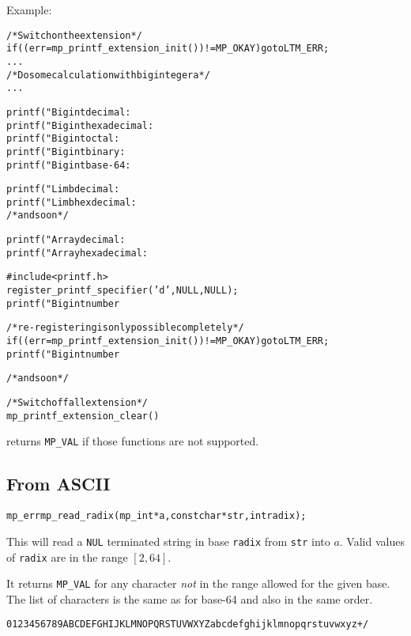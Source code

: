\documentclass[synpaper]{book}
\begin{document}
Example:
\begin{alltt}

/* Switch on the extension */
if((err = mp_printf_extension_init()) != MP_OKAY)   goto LTM_ERR;
   ...
/* Do some calculation with big integer a */
   ...

printf("Bigint decimal: %Zd \textbackslash{}n", &a);
printf("Bigint hexadecimal: %Zx \textbackslash{}n", &a);
printf("Bigint octal: %Zo \textbackslash{}n", &a);
printf("Bigint binary: %Zb \textbackslash{}n", &a);
printf("Bigint base-64: %Z@ \textbackslash{}n", &a);

printf("Limb decimal: %Md \textbackslash{}n", a.dp[0]);
printf("Limb hexdecimal: %Mx \textbackslash{}n", a.dp[0]);
/* and so on */

printf("Array decimal: %Nd \textbackslash{}n", &a);
printf("Array hexadecimal: %Nx \textbackslash{}n", &a);

#include <printf.h>
register_printf_specifier('d', NULL, NULL);
printf("Bigint number %d: %Zx \textbackslash{}n", 123, &a);

/* re-registering is only possible completely */
if((err = mp_printf_extension_init()) != MP_OKAY)   goto LTM_ERR;
printf("Bigint number %i: %Zd \textbackslash{}n", 123, &a);

/* and so on */

/* Switch off all extension */
mp_printf_extension_clear()

\end{alltt}
 returns \texttt{MP\_VAL} if those functions are not supported.

\subsection{From ASCII}
\begin{alltt}
mp_err mp_read_radix (mp_int *a, const char *str, int radix);
\end{alltt}
This will read a \texttt{NUL} terminated string in base \texttt{radix} from \texttt{str} into $a$.
Valid values of \texttt{radix} are in the range $[2, 64]$.

It returns \texttt{MP\_VAL} for any character {\em not} in the range allowed for the given base.
The list of characters is the same as for base-64 and also in the same order.
\begin{alltt}
0123456789ABCDEFGHIJKLMNOPQRSTUVWXYZabcdefghijklmnopqrstuvwxyz+/
\end{alltt}
\end{document}
